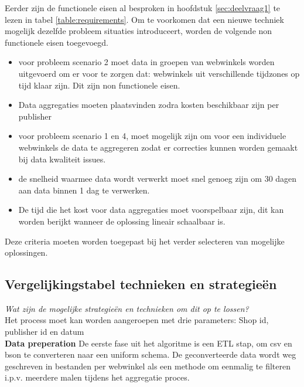 Eerder zijn de functionele eisen al besproken in hoofdstuk \ref{sec:deelvraag1} te lezen in tabel \ref{table:requirements}. Om te voorkomen dat een nieuwe techniek mogelijk dezelfde probleem situaties introduceert, worden de volgende non functionele eisen toegevoegd.
\begin{itemize}
    \item voor probleem scenario 2 moet data in groepen van webwinkels worden uitgevoerd om er voor te zorgen dat: webwinkels uit verschillende tijdzones op tijd klaar zijn. Dit zijn non functionele eisen. 
    
    \item Data aggregaties moeten plaatsvinden zodra kosten beschikbaar zijn per publisher
    
    \item voor probleem scenario 1 en 4, moet mogelijk zijn om voor een individuele webwinkels de data te aggregeren zodat er correcties kunnen worden gemaakt bij data kwaliteit issues. 
    \item de snelheid waarmee data wordt verwerkt moet snel genoeg zijn om 30 dagen aan data binnen 1 dag te verwerken.
    
    \item De tijd die het kost voor data aggregaties moet voorspelbaar zijn, dit kan worden berijkt  wanneer de oplossing lineair schaalbaar is.
\end{itemize}

Deze criteria moeten worden toegepast bij het verder selecteren van mogelijke oplossingen. 



\subsection{Vergelijkingstabel technieken en strategieën}
\label{subsec:deelvraag3b}

\textit{Wat zijn de mogelijke strategieën en technieken om dit op te lossen?} \\

Het process moet kan worden aangeroepen met drie  parameters: Shop id, publisher id en datum \\

\textbf{Data preperation}
De eerste fase uit het algoritme is een ETL stap, om csv en bson te converteren naar een uniform schema.
De geconverteerde data wordt weg geschreven in bestanden per webwinkel als een methode om eenmalig te filteren i.p.v. meerdere malen tijdens het aggregatie proces. \\


